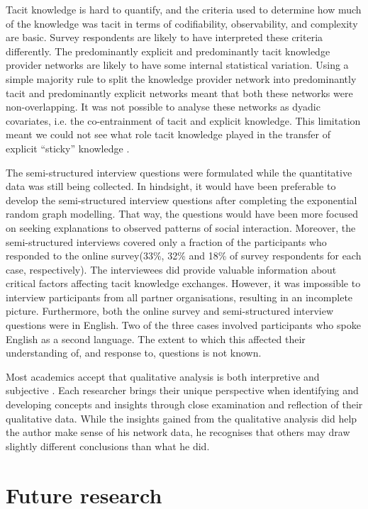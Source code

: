 Tacit knowledge is hard to quantify, and the criteria used to determine how much of the knowledge was tacit in terms of codifiability, observability, and complexity are basic. Survey respondents are likely to have interpreted these criteria differently. The predominantly explicit and predominantly tacit knowledge provider networks are likely to have some internal statistical variation. Using a simple majority rule to split the knowledge provider network into predominantly tacit and predominantly explicit networks meant that both these networks were non-overlapping. It was not possible to analyse these networks as dyadic covariates, i.e. the co-entrainment of tacit and explicit knowledge. This limitation meant we could not see what role tacit knowledge played in the transfer of explicit \enquote{sticky} knowledge \citep{von1994sticky, szulanski2003sticky, seidler2008use}. \medskip

The semi-structured interview questions were formulated while the quantitative data was still being collected. In hindsight, it would have been preferable to develop the semi-structured interview questions after completing the exponential random graph modelling. That way, the questions would have been more focused on seeking explanations to observed patterns of social interaction. Moreover, the semi-structured interviews covered only a fraction of the participants who responded to the online survey(33\%, 32\% and 18\% of survey respondents for each case, respectively). The interviewees did provide valuable information about critical factors affecting tacit knowledge exchanges. However, it was impossible to interview participants from all partner organisations, resulting in an incomplete picture. Furthermore, both the online survey and semi-structured interview questions were in English. Two of the three cases involved participants who spoke English as a second language. The extent to which this affected their understanding of, and response to, questions is not known. \medskip

Most academics accept that qualitative analysis is both interpretive and subjective \citep{aspers2019qualitative}. Each researcher brings their unique perspective when identifying and developing concepts and insights through close examination and reflection of their qualitative data. While the insights gained from the qualitative analysis did help the author make sense of his network data, he recognises that others may draw slightly different conclusions than what he did.

\section{Future research}

